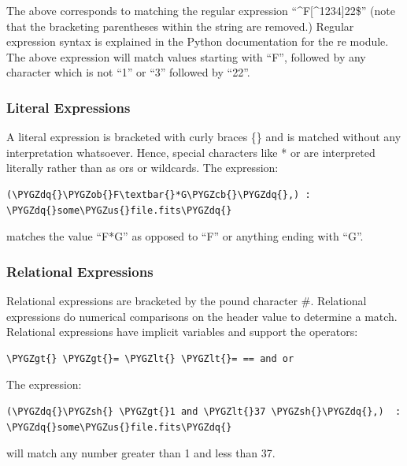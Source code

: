 \documentclass[letterpaper,10pt,english]{sphinxmanual}
\def\PYGZus{\char`\_}
\def\PYGZob{\char`\{}
\def\PYGZcb{\char`\}}
\def\PYGZlt{\char`\<}
\def\PYGZgt{\char`\>}
\def\PYGZsh{\char`\#}
\def\PYGZdq{\char`\"}
\begin{document}
The above corresponds to matching the regular expression ``\textasciicircum{}F{[}\textasciicircum{}1234{]}22\$'' (note that the bracketing parentheses within the
string are removed.)   Regular expression syntax is explained in the Python documentation for the re module. The above
expression will match values starting with ``F'', followed by any character which is not ``1'' or ``3'' followed by ``22''.


\subsubsection{Literal Expressions}
\label{rmap_syntax:literal-expressions}
A literal expression is bracketed with curly braces \{\} and is matched without
any interpretation whatsoever.   Hence,  special characters like * or \textbar{} are
interpreted literally rather than as ors or wildcards.  The expression:

\begin{Verbatim}[commandchars=\\\{\}]
(\PYGZdq{}\PYGZob{}F\textbar{}*G\PYGZcb{}\PYGZdq{},) : \PYGZdq{}some\PYGZus{}file.fits\PYGZdq{}
\end{Verbatim}

matches the value ``F\textbar{}*G'' as opposed to ``F'' or anything ending with ``G''.


\subsubsection{Relational Expressions}
\label{rmap_syntax:relational-expressions}
Relational expressions are bracketed by the pound character \#.   Relational
expressions do numerical comparisons on the header value to determine a match.
Relational expressions have implicit variables and support the operators:

\begin{Verbatim}[commandchars=\\\{\}]
\PYGZgt{} \PYGZgt{}= \PYGZlt{} \PYGZlt{}= == and or
\end{Verbatim}

The expression:

\begin{Verbatim}[commandchars=\\\{\}]
(\PYGZdq{}\PYGZsh{} \PYGZgt{}1 and \PYGZlt{}37 \PYGZsh{}\PYGZdq{},)  : \PYGZdq{}some\PYGZus{}file.fits\PYGZdq{}
\end{Verbatim}

will match any number greater than 1 and less than 37.
\end{document}

